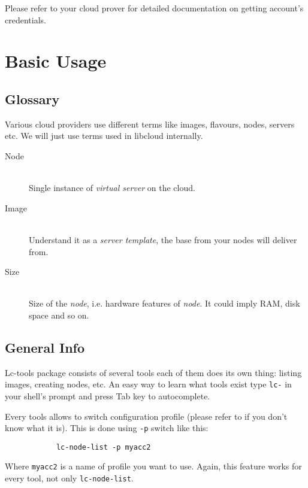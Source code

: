 \documentclass[a4paper]{report}
\begin{document}
      Please refer to your cloud prover for detailed documentation on getting account's
      credentials.

      \section{Basic Usage}
         \subsection{Glossary}
            Various cloud providers use different terms like images, flavours, nodes,
            servers etc. We will just use terms used in libcloud internally. 

            \begin{description}
               \item[Node] \hfill \\
               Single instance of \textit{virtual server} on the cloud. 
               \item[Image] \hfill \\
               Understand it as a \textit{server template}, the base from your nodes
               will deliver from.
               \item[Size] \hfill \\
               Size of the \textit{node}, i.e. hardware features of \textit{node}. 
               It could imply RAM, disk space and so on.
            \end{description}
         \subsection{General Info}
         Lc-tools package consists of several tools each of them does its own thing:
         listing images, creating nodes, etc. An easy way to learn what tools exist
         type \texttt{lc-} in your shell's prompt and press Tab key to autocomplete.

         Every tools allows to switch configuration profile (please refer 
         to  if you don't know what it is). This is done using 
         \texttt{-p} switch like this:

            \begin{verbatim}
            lc-node-list -p myacc2
            \end{verbatim}

         Where \texttt{myacc2} is a name of profile you want to use. Again, this
         feature works for every tool, not only \texttt{lc-node-list}.
\end{document}
